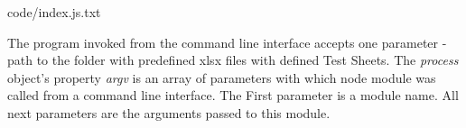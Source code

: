 
{code/index.js.txt}

The program invoked from the command line interface accepts one parameter - path to the folder with predefined xlsx files with defined  Test Sheets. The \textit{process} object's property \textit{argv} is an array of parameters with which node module was called from a command line interface. The First parameter is a module name. All next parameters are the arguments passed to this module.

